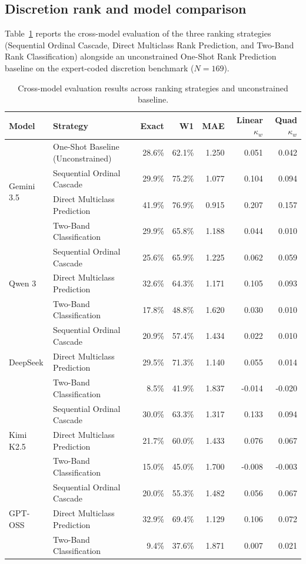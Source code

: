 \documentclass[conference]{IEEEtran}
\begin{document}
\subsection{Discretion rank and model comparison}

Table~\ref{tab:multimodel_large} reports the cross-model evaluation of the three ranking strategies (Sequential Ordinal Cascade, Direct Multiclass Rank Prediction, and Two-Band Rank Classification) alongside an unconstrained One-Shot Rank Prediction baseline on the expert-coded discretion benchmark ($N=169$).

\begin{table}[t]
\centering
\begin{threeparttable}

\caption{Cross-model evaluation results across ranking strategies and unconstrained baseline.}
\label{tab:multimodel_large}
\scriptsize
\begin{tabular}{@{}llrrrrr@{}}
\toprule
\textbf{Model} & \textbf{Strategy} & \textbf{Exact} & \textbf{W1} & \textbf{MAE} & \textbf{Linear $\kappa_w$} & \textbf{Quad $\kappa_w$} \\
\midrule
\multirow{4}{*}{Gemini 3.5} 
  & One-Shot Baseline (Unconstrained) & 28.6\% & 62.1\% & 1.250 & 0.051 & 0.042 \\
  & Sequential Ordinal Cascade & 29.9\% & 75.2\% & 1.077 & 0.104 & 0.094 \\
  & Direct Multiclass Prediction & 41.9\% & 76.9\% & 0.915 & 0.207 & 0.157 \\
  & Two-Band Classification & 29.9\% & 65.8\% & 1.188 & 0.044 & 0.010 \\
\midrule
\multirow{3}{*}{Qwen 3} 
  & Sequential Ordinal Cascade & 25.6\% & 65.9\% & 1.225 & 0.062 & 0.059 \\
  & Direct Multiclass Prediction & 32.6\% & 64.3\% & 1.171 & 0.105 & 0.093 \\
  & Two-Band Classification & 17.8\% & 48.8\% & 1.620 & 0.030 & 0.010 \\
\midrule
\multirow{3}{*}{DeepSeek} 
  & Sequential Ordinal Cascade & 20.9\% & 57.4\% & 1.434 & 0.022 & 0.010 \\
  & Direct Multiclass Prediction & 29.5\% & 71.3\% & 1.140 & 0.055 & 0.014 \\
  & Two-Band Classification & 8.5\% & 41.9\% & 1.837 & -0.014 & -0.020 \\
\midrule
\multirow{3}{*}{Kimi K2.5} 
  & Sequential Ordinal Cascade & 30.0\% & 63.3\% & 1.317 & 0.133 & 0.094 \\
  & Direct Multiclass Prediction & 21.7\% & 60.0\% & 1.433 & 0.076 & 0.067 \\
  & Two-Band Classification & 15.0\% & 45.0\% & 1.700 & -0.008 & -0.003 \\
\midrule
\multirow{3}{*}{GPT-OSS} 
  & Sequential Ordinal Cascade & 20.0\% & 55.3\% & 1.482 & 0.056 & 0.067 \\
  & Direct Multiclass Prediction & 32.9\% & 69.4\% & 1.129 & 0.106 & 0.072 \\
  & Two-Band Classification & 9.4\% & 37.6\% & 1.871 & 0.007 & 0.021 \\
\bottomrule
\end{tabular}


\end{threeparttable}
\end{table}
\end{document}
